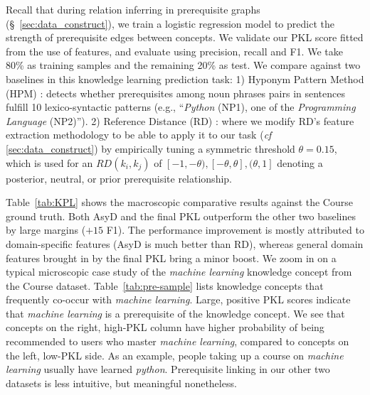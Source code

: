 Recall that during relation inferring in prerequisite graphs (\S~\ref{sec:data_construct}), we train a logistic regression model to predict the strength of prerequisite edges between concepts.
We validate our PKL score fitted from the use of features, and evaluate using precision, recall and F1. 
We take 80\% as training samples and the remaining 20\% as test.
We compare against two baselines in this knowledge learning prediction task: 1) Hyponym Pattern Method (HPM) \cite{wang2016using}: detects whether prerequisites among noun phrases pairs in sentences fulfill 10 lexico-syntactic patterns (e.g., ``\textit{Python} (NP1), one of the \textit{Programming Language} (NP2)''). 
2) Reference Distance (RD) \cite{liang2015measuring}: where
we modify RD's feature extraction methodology to be able to apply it to our task ({\it cf} \ref{sec:data_construct}) by empirically tuning a symmetric threshold $\theta=0.15$, which is used for an $RD(k_i,k_j)$ of $[-1,-\theta), [-\theta,\theta], (\theta,1]$ denoting a posterior, neutral, or prior prerequisite relationship.

Table~\ref{tab:KPL} shows the macroscopic comparative results against the Course ground truth. Both AsyD and the final
PKL outperform the other two baselines by large margins ($+15$ F1).  The performance improvement is mostly attributed to domain-specific features (AsyD is much better than RD),
whereas general domain features brought in by the final PKL bring a minor boost.
We zoom in on a typical microscopic case study of the  {\it machine learning} knowledge concept from the Course dataset. Table~\ref{tab:pre-sample} lists knowledge concepts that frequently co-occur with {\it machine learning}. Large, positive PKL scores indicate that \textit{machine learning} is a prerequisite of the knowledge concept.  We see that concepts on the right, high-PKL column have higher probability of being recommended to users who master {\it machine learning}, compared to concepts on the left, low-PKL side. As an example, people taking up a course on {\it machine learning} usually have learned \textit{python}. Prerequisite linking in our other two datasets is less intuitive, but meaningful nonetheless. 







